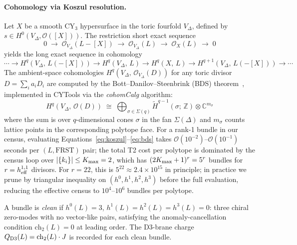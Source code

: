 \documentclass[11pt,a4paper]{article}
\newcommand{\bZ}{\mathbb{Z}}
\newcommand{\bC}{\mathbb{C}}
\newcommand{\cO}{\mathcal{O}}
\newcommand{\ch}{\mathrm{ch}}
\begin{document}
\paragraph{Cohomology via Koszul resolution.}
Let $X$ be a smooth CY$_3$ hypersurface in the toric fourfold
$V_\Delta$, defined by $s\in H^0(V_\Delta, \cO([X]))$.
The restriction short exact sequence
\begin{equation}
  0 \;\to\; \cO_{V_\Delta}(L - [X]) \;\to\; \cO_{V_\Delta}(L)
    \;\to\; \cO_X(L) \;\to\; 0
  \label{eq:koszul}
\end{equation}
yields the long exact sequence in cohomology
\begin{equation}
  \cdots \to H^q(V_\Delta,\, L(-[X])) \to H^q(V_\Delta,\, L)
           \to H^q(X,\, L)
           \to H^{q+1}(V_\Delta,\, L(-[X])) \to \cdots
  \label{eq:les}
\end{equation}
The ambient-space cohomologies $H^q(V_\Delta,\, \cO_{V_\Delta}(D))$ for any
toric divisor $D = \sum_i a_i D_i$ are computed by the
Bott--Danilov--Steenbrink (BDS) theorem~\cite{CYTools2022},
implemented in CYTools via the \emph{cohomCalg} algorithm:
\begin{equation}
  H^q(V_\Delta,\, \cO(D)) \;\cong\;
  \bigoplus_{\sigma \in \Sigma(q)}
  \widetilde H^{q-1}\!\left(\sigma;\, \bZ\right)
  \otimes \bC^{m_\sigma}
  \label{eq:bds}
\end{equation}
where the sum is over $q$-dimensional cones $\sigma$ in the fan
$\Sigma(\Delta)$ and $m_\sigma$ counts lattice points in the
corresponding polytope face.
For a rank-1 bundle in our census, evaluating
Equations~\eqref{eq:koszul}--\eqref{eq:bds} takes
$\mathcal{O}(10^{-2})$--$\mathcal{O}(10^{-1})$ seconds per $(L, \text{FRST})$
pair; the total T2 cost per polytope is dominated by the
census loop over $|\{k_i\}| \leq K_{\rm max} = 2$, which has
$(2K_{\rm max}+1)^r = 5^r$ bundles for $r = h^{1,1}_{\rm eff}$
divisors.
For $r = 22$, this is $5^{22} \approx 2.4\times 10^{15}$ in principle;
in practice we prune by triangular inequality on
$(h^0,h^1,h^2,h^3)$ before the full evaluation, reducing the
effective census to $10^4$--$10^6$ bundles per polytope.

A bundle is \emph{clean} if $h^0(L)=3$, $h^1(L)=h^2(L)=h^3(L)=0$:
three chiral zero-modes with no vector-like pairs, satisfying
the anomaly-cancellation condition $\ch_2(L)=0$ at leading order.
The D3-brane charge $Q_{\rm D3}(L) = \ch_2(L)\cdot J$
is recorded for each clean bundle.
\end{document}
